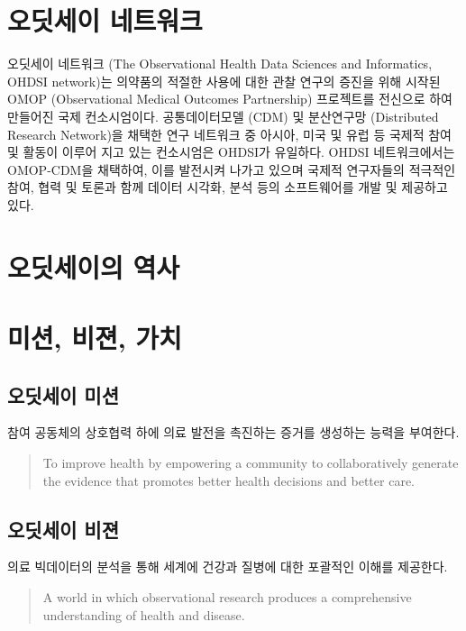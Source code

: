 \documentclass[]{book}
\begin{document}
\hypertarget{OHDSINetwork}{%
\section{오딧세이 네트워크}\label{OHDSINetwork}}

오딧세이 네트워크 (The Observational Health Data Sciences and Informatics, OHDSI network)는 의약품의 적절한 사용에 대한 관찰 연구의 증진을 위해 시작된 OMOP (Observational Medical Outcomes Partnership) 프로젝트를 전신으로 하여 만들어진 국제 컨소시엄이다. 공통데이터모델 (CDM) 및 분산연구망 (Distributed Research Network)을 채택한 연구 네트워크 중 아시아, 미국 및 유럽 등 국제적 참여 및 활동이 이루어 지고 있는 컨소시엄은 OHDSI가 유일하다. OHDSI 네트워크에서는 OMOP-CDM을 채택하여, 이를 발전시켜 나가고 있으며 국제적 연구자들의 적극적인 참여, 협력 및 토론과 함께 데이터 시각화, 분석 등의 소프트웨어를 개발 및 제공하고 있다.

\hypertarget{OHDSIHistory}{%
\section{오딧세이의 역사}\label{OHDSIHistory}}

\hypertarget{MissionVissionValues}{%
\section{미션, 비젼, 가치}\label{MissionVissionValues}}

\hypertarget{section}{%
\subsection{오딧세이 미션}\label{section}}

참여 공동체의 상호협력 하에 의료 발전을 촉진하는 증거를 생성하는 능력을 부여한다.

\begin{quote}
To improve health by empowering a community to collaboratively generate the evidence that promotes better health decisions and better care.
\end{quote}

\hypertarget{section-1}{%
\subsection{오딧세이 비젼}\label{section-1}}

의료 빅데이터의 분석을 통해 세계에 건강과 질병에 대한 포괄적인 이해를 제공한다.

\begin{quote}
A world in which observational research produces a comprehensive understanding of health and disease.
\end{quote}
\end{document}
